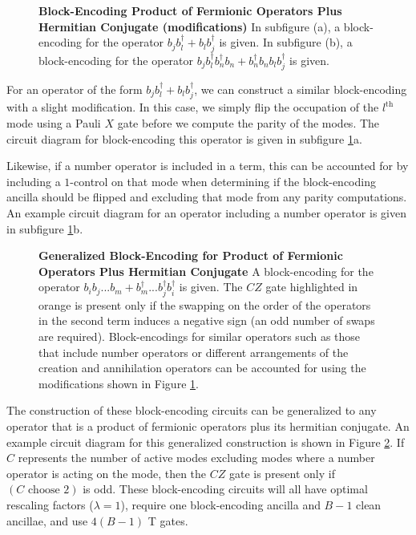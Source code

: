 \begin{figure}
    
    
    \caption{
        \textbf{Block-Encoding Product of Fermionic Operators Plus Hermitian Conjugate (modifications)}
        In subfigure (a), a block-encoding for the operator $b_j b_l^\dagger + b_l b_j^\dagger$ is given.
        In subfigure (b), a block-encoding for the operator $b_j b_l^\dagger b_n^\dagger b_n + b_n^\dagger b_n b_l b_j^\dagger$ is given.
    }
    \label{fig:fermionic-be-lc-modifications}
\end{figure}

For an operator of the form $b_j b_l^\dagger + b_l b_j^\dagger$, we can construct a similar block-encoding with a slight modification.
In this case, we simply flip the occupation of the $l^\text{th}$ mode using a Pauli $X$ gate before we compute the parity of the modes.
The circuit diagram for block-encoding this operator is given in subfigure \ref{fig:fermionic-be-lc-modifications}a.

Likewise, if a number operator is included in a term, this can be accounted for by including a $1$-control on that mode when determining if the block-encoding ancilla should be flipped and excluding that mode from any parity computations.
An example circuit diagram for an operator including a number operator is given in subfigure \ref{fig:fermionic-be-lc-modifications}b.

\begin{figure}
    
    \caption{
        \textbf{Generalized Block-Encoding for Product of Fermionic Operators Plus Hermitian Conjugate}
        A block-encoding for the operator $b_i b_j ... b_m + b_m^\dagger ... b_j^\dagger b_i^\dagger$ is given.
        The $CZ$ gate highlighted in orange is present only if the swapping on the order of the operators in the second term induces a negative sign (an odd number of swaps are required).
        Block-encodings for similar operators such as those that include number operators or different arrangements of the creation and annihilation operators can be accounted for using the modifications shown in Figure \ref{fig:fermionic-be-lc-modifications}.
    }
    \label{fig:fermionic-be-lc}
\end{figure}

The construction of these block-encoding circuits can be generalized to any operator that is a product of fermionic operators plus its hermitian conjugate.
An example circuit diagram for this generalized construction is shown in Figure \ref{fig:fermionic-be-lc}.
If $C$ represents the number of active modes excluding modes where a number operator is acting on the mode, then the $CZ$ gate is present only if $(C \text{ choose } 2)$ is odd.
These block-encoding circuits will all have optimal rescaling factors ($\lambda=1$), require one block-encoding ancilla and $B - 1$ clean ancillae, and use $4(B-1)$ T gates.

